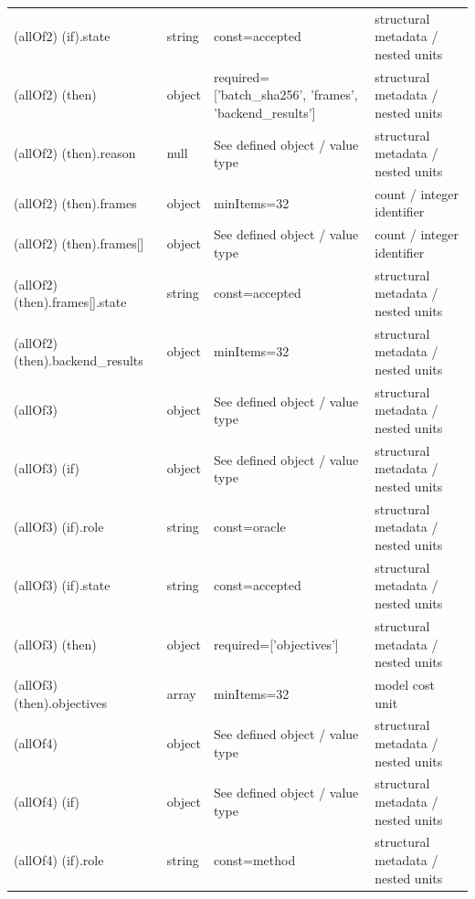 \begin{longtable}{@{}>{\raggedright\arraybackslash}p{}>{\raggedright\arraybackslash}p{}>{\raggedright\arraybackslash}p{}>{\raggedright\arraybackslash}p{}@{}}
 (allOf2) (if).\allowbreak{}state & string & const=\allowbreak{}accepted & structural metadata /\allowbreak{} nested units\\
 (allOf2) (then) & object & required=\allowbreak{}['batch\_\allowbreak{}sha256', 'frames', 'backend\_\allowbreak{}results'] & structural metadata /\allowbreak{} nested units\\
 (allOf2) (then).\allowbreak{}reason & null & See defined object /\allowbreak{} value type & structural metadata /\allowbreak{} nested units\\
 (allOf2) (then).\allowbreak{}frames & object & minItems=\allowbreak{}32 & count /\allowbreak{} integer identifier\\
 (allOf2) (then).\allowbreak{}frames[] & object & See defined object /\allowbreak{} value type & count /\allowbreak{} integer identifier\\
 (allOf2) (then).\allowbreak{}frames[].\allowbreak{}state & string & const=\allowbreak{}accepted & structural metadata /\allowbreak{} nested units\\
 (allOf2) (then).\allowbreak{}backend\_\allowbreak{}results & object & minItems=\allowbreak{}32 & structural metadata /\allowbreak{} nested units\\
 (allOf3) & object & See defined object /\allowbreak{} value type & structural metadata /\allowbreak{} nested units\\
 (allOf3) (if) & object & See defined object /\allowbreak{} value type & structural metadata /\allowbreak{} nested units\\
 (allOf3) (if).\allowbreak{}role & string & const=\allowbreak{}oracle & structural metadata /\allowbreak{} nested units\\
 (allOf3) (if).\allowbreak{}state & string & const=\allowbreak{}accepted & structural metadata /\allowbreak{} nested units\\
 (allOf3) (then) & object & required=\allowbreak{}['objectives'] & structural metadata /\allowbreak{} nested units\\
 (allOf3) (then).\allowbreak{}objectives & array & minItems=\allowbreak{}32 & model cost unit\\
 (allOf4) & object & See defined object /\allowbreak{} value type & structural metadata /\allowbreak{} nested units\\
 (allOf4) (if) & object & See defined object /\allowbreak{} value type & structural metadata /\allowbreak{} nested units\\
 (allOf4) (if).\allowbreak{}role & string & const=\allowbreak{}method & structural metadata /\allowbreak{} nested units\\

\end{longtable}

